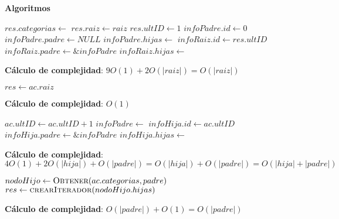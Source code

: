 \documentclass[10pt, a4paper]{article}
\let\TipoVariable=\texttt
\let\ModificadorArgumento=\textbf
\newcommand{\In}[2]{\ModificadorArgumento{in} \ensuremath{#1}\,: \TipoVariable{#2}\xspace}
\newcommand{\Inout}[2]{\ModificadorArgumento{in/out} \ensuremath{#1}\,: \TipoVariable{#2}\xspace}
\newenvironment{Servicios Usados}{%
  \vspace*{2ex}
  \noindent\textbf{\Large Servicios Usados}%
  \vspace*{2ex}
}{}
\newenvironment{Algoritmos}{%
  \vspace*{2ex}%
  \noindent\textbf{\Large Algoritmos}%
  \vspace*{2ex}%
}{}
\newenvironment{Algoritmos Del Iterador}{%
  \vspace*{2ex}%
  \noindent\textbf{\Large Algoritmos Del Iterador}%
  \vspace*{2ex}%
}{}
\newcommand{\DRef}{\ensuremath{\rightarrow}}
\begin{document}
\begin{Algoritmos}

\begin{algorithm}[H]
\caption*{iNuevoAC(\In{raiz}{categoria}) $\DRef res$ : \TipoVariable{abCat}}
\begin{algorithmic}[1]
	\State $res.categorias \gets$ 
	\State $res.raiz \gets raiz$
	\State $res.ultID \gets 1$
	\Statex
	\State $infoPadre.id \gets 0$
	\State $infoPadre.padre \gets NULL$
	\State $infoPadre.hijas \gets$ 
	\Statex
	\State $infoRaiz.id \gets res.ultID$
	\State $infoRaiz.padre \gets \&infoPadre$
	\State $infoRaiz.hijas \gets$ 
	\State {}
\end{algorithmic}
\textbf{C\'alculo de complejidad}: $9O(1) + 2O(|raiz|) = O(|raiz|)$
\end{algorithm}

\begin{algorithm}[H]
\caption*{iRaiz(\In{ac}{abCat}) $\DRef res$ : \TipoVariable{categoria}}
\begin{algorithmic}[1]
	\State $res \gets ac.raiz$
\end{algorithmic}
\textbf{C\'alculo de complejidad}: $O(1)$
\end{algorithm}

\begin{algorithm}[H]
\caption*{iAgregar(\Inout{ac}{abCat}, \In{padre}{categoria}, \In{hija}{categoria})}
\begin{algorithmic}[1]
	\State $ac.ultID \gets ac.ultID + 1$
	\State $infoPadre \gets$ 
	\Statex
	\State $infoHija.id \gets ac.ultID$
	\State $infoHija.padre \gets \&infoPadre$
	\State $infoHija.hijas \gets$ 
	\State {}
	\Statex
	\State {}
\end{algorithmic}
\textbf{C\'alculo de complejidad}: $4O(1) + 2O(|hija|) + O(|padre|) = O(|hija|) + O(|padre|) = O(|hija| + |padre|)$
\end{algorithm}

\begin{algorithm}[H]
\caption*{iHijas(\In{ac}{abCat}, \In{padre}{categoria}) $\DRef res$ : \TipoVariable{iteradorUni(categoria)}}
\begin{algorithmic}[1]
    \State $nodoHijo \gets \Call{Obtener}{ac.categorias, padre}$
	\State $res \gets \Call{crearIterador}{nodoHijo.hijas}$
\end{algorithmic}
\textbf{C\'alculo de complejidad}: $O(|padre|) + O(1) = O(|padre|)$
\end{algorithm}


\end{Algoritmos}
\end{document}
